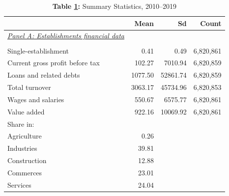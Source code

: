 \begin{table}[htbp]
\centering
\begin{threeparttable}
\caption{\textbf{Table \ref{tab:summary_stats}:} Summary Statistics, 2010--2019}
\label{tab:summary_stats}
\begin{tabular}{lrrr}
\toprule
& Mean & Sd & Count \\
\midrule
\textit{\underline{Panel A: Establishments financial data}} & & & \\
& \\
Single-establishment & 0.41 & 0.49 & 6,820,861 \\
Current gross profit before tax  & 102.27 & 7010.94 & 6,820,859 \\
Loans and related debts  & 1077.50 & 52861.74 & 6,820,859 \\
Total turnover  & 3063.17 & 45734.96 & 6,820,853 \\
Wages and salaries & 550.67 & 6575.77 & 6,820,861 \\
Value added & 922.16 & 10069.92 & 6,820,861 \\
Share in: \\ 
\hspace{1em}Agriculture & 0.26 &  &  \\
\hspace{1em}Industries & 39.81 &  &  \\
\hspace{1em}Construction & 12.88 &  &  \\
\hspace{1em}Commerces & 23.01 &  &  \\
\hspace{1em}Services  & 24.04 &  &  \\


\end{tabular}
\end{threeparttable}
\end{table}
